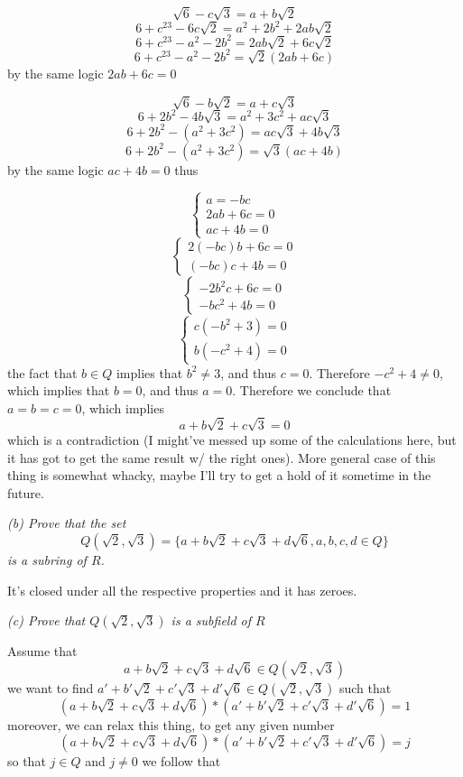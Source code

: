 \documentclass[11pt,oneside,titlepage]{book}
\newcommand{\set}[1]{\{ #1 \}}
\begin{document}
$$\sqrt{6} - c\sqrt{3}= a + b\sqrt{2} $$
$$6 + c^23 - 6c \sqrt{2}= a^2 + 2b^2 + 2ab\sqrt{2}$$
$$6 + c^23 - a^2 - 2b^2 =  2ab\sqrt{2} +  6c \sqrt{2}$$
$$6 + c^23 - a^2 - 2b^2 =  \sqrt{2}(2ab + 6c)$$
by the same logic $2ab + 6c = 0$

$$\sqrt{6} - b\sqrt{2}= a + c\sqrt{3} $$
$$6 + 2b^2 - 4b\sqrt{3}= a^2 + 3c^2 + ac\sqrt{3}$$
$$6 + 2b^2 - (a^2 + 3c^2) = ac\sqrt{3} + 4b\sqrt{3}$$
$$6 + 2b^2 - (a^2 + 3c^2) = \sqrt{3}(ac + 4b)$$
by the same logic $ac + 4b = 0$
thus

$$
\begin{cases}
  a = -bc \\
  2ab + 6c = 0 \\
  ac + 4b = 0
\end{cases}
$$
$$
\begin{cases}
  2(-bc)b + 6c = 0 \\
  (-bc)c + 4b = 0
\end{cases}
$$
$$
\begin{cases}
  -2b^2c + 6c = 0 \\
  -bc^2 + 4b = 0
\end{cases}
$$
$$
\begin{cases}
  c(-b^2 + 3) = 0 \\
  b(-c^2 + 4) = 0
\end{cases}
$$
the fact that $b \in Q$ implies that $b^2 \neq 3$, and thus $c =
0$. Therefore $-c^2 + 4 \neq 0$, which implies that $b = 0$, and thus
$a = 0$. Therefore we conclude that $a = b = c = 0$, which implies
$$a + b\sqrt{2} + c\sqrt{3} = 0$$
which is a contradiction (I might've messed up some of the
calculations here, but it has got to get the same result w/ the right
ones). More general case of this thing is somewhat whacky, maybe I'll try
to get a hold of it sometime in the future.

\textit{(b) Prove that the set
  $$Q(\sqrt{2}, \sqrt{3}) = \set{a + b\sqrt{2} + c\sqrt{3} + d\sqrt{6}, a, b, c, d \in Q}$$
  is a subring of $R$.
}

It's closed under all the respective properties and it has zeroes.

\textit{(c) Prove that $Q(\sqrt{2}, \sqrt{3})$ is a subfield of $R$}

Assume that
$$a + b\sqrt{2} + c\sqrt{3} + d\sqrt{6} \in Q(\sqrt{2}, \sqrt{3})$$
we want to find $a' + b'\sqrt{2} + c'\sqrt{3} + d'\sqrt{6} \in Q(\sqrt{2}, \sqrt{3})$ such that
$$ (a + b\sqrt{2} + c\sqrt{3} + d\sqrt{6}) * (a' + b'\sqrt{2} + c'\sqrt{3} + d'\sqrt{6}) = 1$$
moreover, we can relax this thing, to get any given number
$$ (a + b\sqrt{2} + c\sqrt{3} + d\sqrt{6}) * (a' + b'\sqrt{2} + c'\sqrt{3} + d'\sqrt{6}) = j$$
so that $j \in Q$ and $j \neq 0$
we follow that
\end{document}
